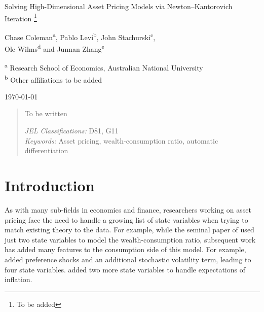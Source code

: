 \documentclass[12pt, reqno]{amsart}
\newcommand\blfootnote[1]{%
  \begingroup
  \renewcommand\thefootnote{}\footnote{#1}%
  \addtocounter{footnote}{-1}%
  \endgroup
}
\newcommand{\1}{\mathbbm 1}
\theoremstyle{plain}
\theoremstyle{definition}
\begin{document}
\title{}




\begin{center}
    \LARGE 
    Solving High-Dimensional Asset Pricing Models via Newton--Kantorovich
    Iteration
    \blfootnote{To be added}
 
    \vspace{1em}

    \large
    Chase Coleman\textsuperscript{a}, Pablo Levi\textsuperscript{b}, John
    Stachurski\textsuperscript{c}, \\ Ole Wilms\textsuperscript{d} and Junnan Zhang\textsuperscript{e} \par \bigskip

    \small
    \textsuperscript{a} Research School of Economics, Australian National University \\ 
    \textsuperscript{b} Other affiliations to be added  \\ \bigskip

    \normalsize
    \today
\end{center}


\begin{abstract}
    To be written
    \vspace{1em}

    \noindent
    \textit{JEL Classifications:} D81, G11 \\
    \textit{Keywords:} Asset pricing, wealth-consumption ratio, automatic differentiation
\end{abstract}





\maketitle


\section{Introduction}

As with many sub-fields in economics and finance, researchers working on asset
pricing face the need to handle a growing list of state variables when trying to
match existing theory to the data.  For example, while the seminal paper of
\cite{bansal2004risks} used just two state variables to model the
wealth-consumption ratio, subsequent work has added many features to the
consumption side of this model.  For example, \cite{schorfheide2018identifying}
added preference shocks and an additional stochastic volatility term, leading to
four state variables. \cite{gomez2021important} added two more state variables
to handle expectations of inflation.  
\end{document}
